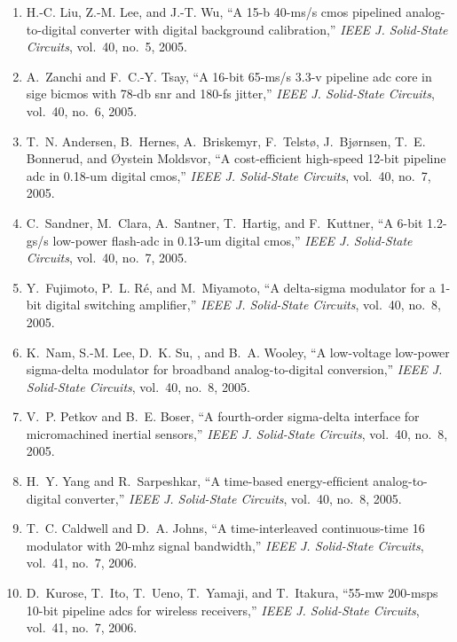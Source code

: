 \begin{enumerate}
\item
H.-C. Liu, Z.-M. Lee, and J.-T. Wu, ``A 15-b 40-ms/s cmos pipelined
  analog-to-digital converter with digital background calibration,''
  \emph{{IEEE} J. Solid-State Circuits}, vol.~40, no.~5, 2005.

\item
A.~Zanchi and F.~C.-Y. Tsay, ``A 16-bit 65-ms/s 3.3-v pipeline adc core in sige
  bicmos with 78-db snr and 180-fs jitter,'' \emph{{IEEE} J. Solid-State
  Circuits}, vol.~40, no.~6, 2005.

\item
T.~N. Andersen, B.~Hernes, A.~Briskemyr, F.~Telstø, J.~Bjørnsen, T.~E.
  Bonnerud, and Øystein Moldsvor, ``A cost-efficient high-speed 12-bit
  pipeline adc in 0.18-um digital cmos,'' \emph{{IEEE} J. Solid-State
  Circuits}, vol.~40, no.~7, 2005.

\item
C.~Sandner, M.~Clara, A.~Santner, T.~Hartig, and F.~Kuttner, ``A 6-bit 1.2-gs/s
  low-power flash-adc in 0.13-um digital cmos,'' \emph{{IEEE} J. Solid-State
  Circuits}, vol.~40, no.~7, 2005.

\item
Y.~Fujimoto, P.~L. Ré, and M.~Miyamoto, ``A delta-sigma modulator for a 1-bit
  digital switching amplifier,'' \emph{{IEEE} J. Solid-State Circuits},
  vol.~40, no.~8, 2005.

\item
K.~Nam, S.-M. Lee, D.~K. Su, , and B.~A. Wooley, ``A low-voltage low-power
  sigma-delta modulator for broadband analog-to-digital conversion,''
  \emph{{IEEE} J. Solid-State Circuits}, vol.~40, no.~8, 2005.

\item
V.~P. Petkov and B.~E. Boser, ``A fourth-order sigma-delta interface for
  micromachined inertial sensors,'' \emph{{IEEE} J. Solid-State Circuits},
  vol.~40, no.~8, 2005.

\item
H.~Y. Yang and R.~Sarpeshkar, ``A time-based energy-efﬁcient
  analog-to-digital converter,'' \emph{{IEEE} J. Solid-State Circuits},
  vol.~40, no.~8, 2005.

\item
T.~C. Caldwell and D.~A. Johns, ``A time-interleaved continuous-time 16
  modulator with 20-mhz signal bandwidth,'' \emph{{IEEE} J. Solid-State
  Circuits}, vol.~41, no.~7, 2006.

\item
D.~Kurose, T.~Ito, T.~Ueno, T.~Yamaji, and T.~Itakura, ``55-mw 200-msps 10-bit
  pipeline adcs for wireless receivers,'' \emph{{IEEE} J. Solid-State
  Circuits}, vol.~41, no.~7, 2006.


\end{enumerate}
